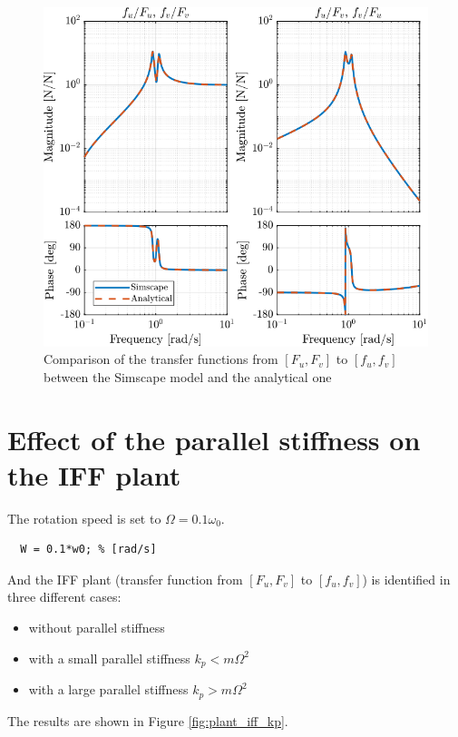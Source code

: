 \documentclass[a4paper, 10pt, DIV=12, parskip=full]{scrreprt}
\begin{document}
\begin{figure}[htbp]
\centering
\includegraphics[scale=1]{figs/plant_iff_kp_comp_simscape_analytical.png}
\caption{\label{fig:plant_iff_kp_comp_simscape_analytical}Comparison of the transfer functions from \([F_u, F_v]\) to \([f_u, f_v]\) between the Simscape model and the analytical one}
\end{figure}

\section{Effect of the parallel stiffness on the IFF plant}
\label{sec:orge9068cb}
The rotation speed is set to \(\Omega = 0.1 \omega_0\).
\begin{verbatim}
  W = 0.1*w0; % [rad/s]
\end{verbatim}

And the IFF plant (transfer function from \([F_u, F_v]\) to \([f_u, f_v]\)) is identified in three different cases:
\begin{itemize}
\item without parallel stiffness
\item with a small parallel stiffness \(k_p < m \Omega^2\)
\item with a large parallel stiffness \(k_p > m \Omega^2\)
\end{itemize}

The results are shown in Figure \ref{fig:plant_iff_kp}.
\end{document}
